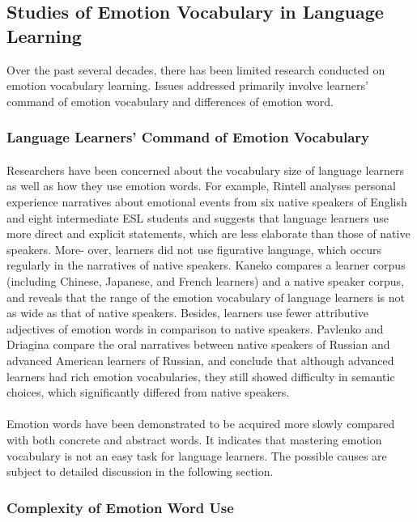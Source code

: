 \documentclass[a4paper,12pt,oneside]{article}
\begin{document}
\subsection{Studies of Emotion Vocabulary in Language Learning}
Over the past several decades, there has been limited research conducted on emotion vocabulary learning. Issues addressed primarily involve learners’ command of emotion vocabulary and differences of emotion word. 
\subsubsection{Language Learners’ Command of Emotion Vocabulary}
\paragraph{}
Researchers have been concerned about the vocabulary size of language learners as well as how they use emotion words. For example, Rintell analyses personal experience narratives about emotional events from six native speakers of English and eight intermediate ESL students and suggests that language learners use more direct and explicit statements, which are less elaborate than those of native speakers. More- over, learners did not use figurative language, which occurs regularly in the narratives of native speakers. Kaneko compares a learner corpus (including Chinese, Japanese, and French learners) and a native speaker corpus, and reveals that the range of the emotion vocabulary of language learners is not as wide as that of native speakers. Besides, learners use fewer attributive adjectives of emotion words in comparison to native speakers. Pavlenko and Driagina compare the oral narratives between native speakers of Russian and advanced American learners of Russian, and conclude that although advanced learners had rich emotion vocabularies, they still showed difficulty in semantic choices, which significantly differed from native speakers. 
\paragraph{}
Emotion words have been demonstrated to be acquired more slowly compared with both concrete and abstract words. It indicates that mastering emotion vocabulary is not an easy task for language learners. The possible causes are subject to detailed discussion in the following section. 

\subsubsection{Complexity of Emotion Word Use}
\end{document}
